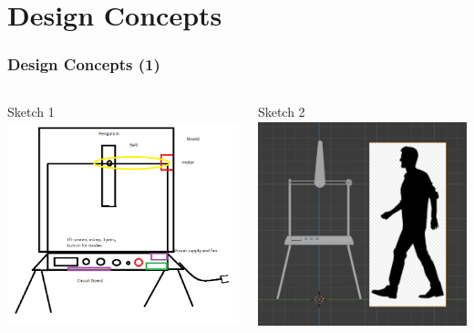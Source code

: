 \documentclass[aspectratio=169]{beamer}
\begin{document}
\section{Design Concepts}
\begin{frame}
    \frametitle{Design Concepts (1)}

    \begin{columns}
        \begin{column}{0.48\textwidth}
            \begin{block}{Sketch 1}
                \includegraphics[height=6cm]{../../Notes/Sketches/Basic Mock-Up Sketch.png}
            \end{block}
        \end{column}

        \begin{column}{0.48\textwidth}
            \begin{block}{Sketch 2}
                \includegraphics[height=6cm]{Scale}
            \end{block}
        \end{column}
    \end{columns}


\end{frame}
\end{document}
